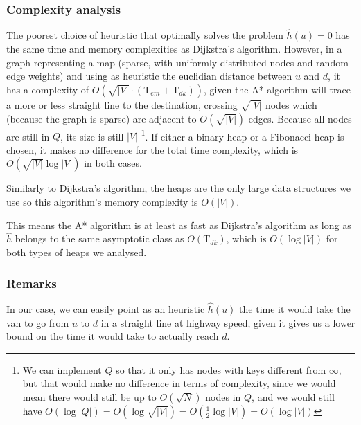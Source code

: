 \subsubsection{Complexity analysis}
The poorest choice of heuristic that optimally solves the problem $\hat{h}(u)=0$ has the same time and memory complexities as Dijkstra's algorithm. However, in a graph representing a map (sparse, with uniformly-distributed nodes and random edge weights) and using as heuristic the euclidian distance between $u$ and $d$, it has a complexity of $O(\sqrt{|V|} \cdot (\text{T}_{em}+\text{T}_{dk}))$, given the A* algorithm will trace a more or less straight line to the destination, crossing $\sqrt{|V|}$ nodes which (because the graph is sparse) are adjacent to $O(\sqrt{|V|})$ edges. Because all nodes are still in $Q$, its size is still $|V|$ \footnote{We can implement $Q$ so that it only has nodes with keys different from $\infty$, but that would make no difference in terms of complexity, since we would mean there would still be up to $O(\sqrt{N})$ nodes in $Q$, and we would still have $O(\log |Q|)=O(\log \sqrt{|V|})=O(\frac{1}{2}\log |V|)=O(\log |V|)$}.
If either a binary heap or a Fibonacci heap is chosen, it makes no difference for the total time complexity, which is $O(\sqrt{|V|} \log |V|)$ in both cases.\par
Similarly to Dijkstra's algorithm, the heaps are the only large data structures we use so this algorithm's memory complexity is $O(|V|)$.\par
This means the A* algorithm is at least as fast as Dijkstra's algorithm as long as $\hat{h}$ belongs to the same asymptotic class as $O(\text{T}_{dk})$, which is $O(\log |V|)$ for both types of heaps we analysed.
\subsubsection{Remarks}
In our case, we can easily point as an heuristic $\hat{h}(u)$ the time it would take the van to go from $u$ to $d$ in a straight line at highway speed, given it gives us a lower bound on the time it would take to actually reach $d$.
